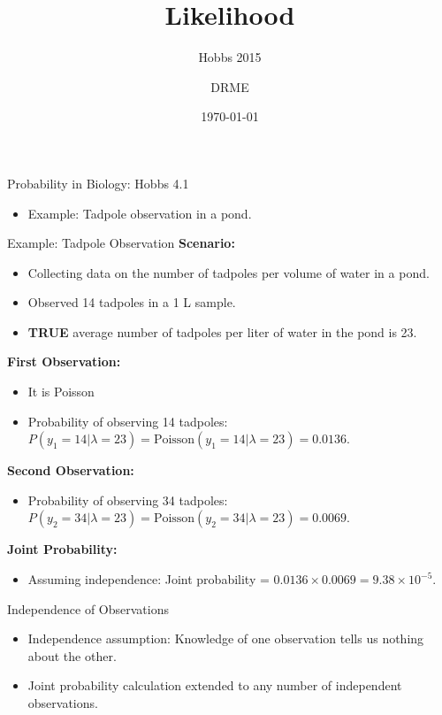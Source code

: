 \documentclass{beamer}
\begin{document}
\title{Likelihood}
\subtitle{Hobbs 2015}
\author{DRME}
\date{\today}

\begin{frame}
  \titlepage
\end{frame}

\begin{frame}{Probability in Biology: Hobbs 4.1}
  \begin{itemize}
    \item Example: Tadpole observation in a pond.
  \end{itemize}
\end{frame}

\begin{frame}{Example: Tadpole Observation}
  \textbf{Scenario:}
  \begin{itemize}
    \item Collecting data on the number of tadpoles per volume of water in a pond.
    \item Observed 14 tadpoles in a 1 L sample.
    \item {\bf{TRUE}} average number of tadpoles per liter of water in the pond is 23.
  \end{itemize}

  \textbf{First Observation:}
  \begin{itemize}
  \item It is Poisson
    \item Probability of observing 14 tadpoles: $P(y_1 = 14|\lambda = 23) = \text{Poisson}(y_1 = 14|\lambda = 23) = 0.0136$.
  \end{itemize}

  \textbf{Second Observation:}
  \begin{itemize}
    \item Probability of observing 34 tadpoles: $P(y_2 = 34|\lambda = 23) = \text{Poisson}(y_2 = 34|\lambda = 23) = 0.0069$.
  \end{itemize}

  \textbf{Joint Probability:}
  \begin{itemize}
    \item Assuming independence: Joint probability = $0.0136 \times 0.0069 = 9.38 \times 10^{-5}$.
  \end{itemize}
\end{frame}

\begin{frame}{Independence of Observations}
  \begin{itemize}
    \item Independence assumption: Knowledge of one observation tells us nothing about the other.
    \item Joint probability calculation extended to any number of independent observations.
  \end{itemize}
\end{frame}
\end{document}
